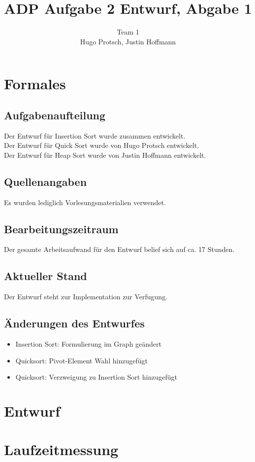 \documentclass[11pt]{article}
\title{ADP Aufgabe 2 Entwurf, Abgabe 1}
\author{Team 1\\Hugo Protsch, Justin Hoffmann}
\begin{document}
    \maketitle

    \tableofcontents

    \newpage


    \section{Formales}\label{sec:Formales}


    \subsection*{Aufgabenaufteilung}
    Der Entwurf für Insertion Sort wurde zusammen entwickelt.\\
    Der Entwurf für Quick Sort wurde von Hugo Protsch entwickelt.\\
    Der Entwurf für Heap Sort wurde von Justin Hoffmann entwickelt.

    \subsection*{Quellenangaben}
    Es wurden lediglich Vorlesungsmaterialien verwendet.

    \subsection*{Bearbeitungszeitraum}
    Der gesamte Arbeitsaufwand für den Entwurf belief sich auf ca. 17 Stunden.


    \subsection*{Aktueller Stand}
    Der Entwurf steht zur Implementation zur Verfugung.

    \subsection*{Änderungen des Entwurfes}
    \begin{itemize}
        \item Insertion Sort: Formulierung im Graph geändert
        \item Quicksort: Pivot-Element Wahl hinzugefügt
        \item Quicksort: Verzweigung zu Insertion Sort hinzugefügt
    \end{itemize}

    \section{Entwurf}\label{sec:entwurf}
    

    \section{Laufzeitmessung}\label{sec:laufzeitmessung}
    
\end{document}
